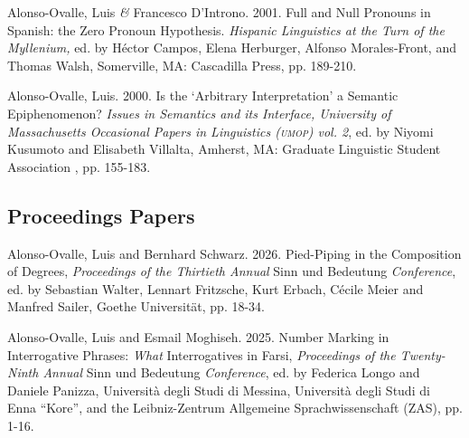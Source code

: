 \documentclass[11pt]{article}
\begin{document}
Alonso-Ovalle, Luis \textit{\&} Francesco D'Introno. 2001. Full and Null Pronouns in Spanish: the Zero Pronoun Hypothesis. \textit{Hispanic Linguistics at the Turn of the Myllenium,} ed. by H\'ector Campos, Elena Herburger, Alfonso Morales-Front, and Thomas Walsh, Somerville, MA: Cascadilla Press, pp. 189-210.

Alonso-Ovalle, Luis. 2000. Is the `Arbitrary Interpretation' a Semantic Epiphenomenon? {\it Issues in Semantics and its Interface, University of Massachusetts Occasional Papers in Linguistics (\textsc{umop}) vol. 2}, ed. by  Niyomi Kusumoto and Elisabeth Villalta, Amherst, MA: Graduate Linguistic Student Association , pp. 155-183. 



\subsection*{Proceedings Papers}

Alonso-Ovalle, Luis and Bernhard Schwarz. 2026. Pied-Piping in the Composition of Degrees, \textit{Proceedings of the Thirtieth Annual} Sinn und Bedeutung \textit{Conference}, ed. by Sebastian Walter, Lennart Fritzsche, Kurt Erbach, C\'ecile Meier and Manfred Sailer, Goethe Universit\"{a}t, pp. 18-34.


Alonso-Ovalle, Luis and Esmail Moghiseh. 2025. Number Marking in Interrogative Phrases: \textit{What} Interrogatives in Farsi, \textit{Proceedings of the Twenty-Ninth Annual} Sinn und Bedeutung \textit{Conference}, ed. by Federica Longo and Daniele Panizza, Universit\`a degli Studi di Messina, Universit\`a degli Studi di Enna ``Kore'', and the Leibniz-Zentrum Allgemeine Sprachwissenschaft (ZAS), pp. 1-16.
\end{document}

